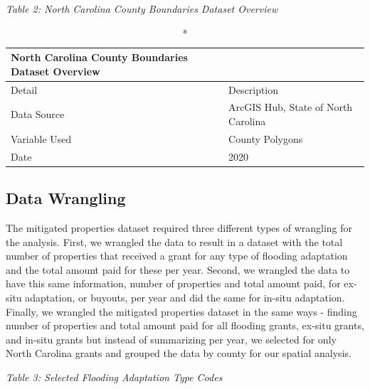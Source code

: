 \documentclass[
  12pt,
]{article}
\begin{document}
\emph{Table 2: North Carolina County Boundaries Dataset Overview}
\captionsetup[table]{labelformat=empty,skip=1pt}

\begin{longtable}{ll}
\caption*{
{\large North Carolina County Boundaries Dataset Overview}
} \\ 
\toprule
Detail & Description \\ 
\midrule
Data Source & ArcGIS Hub, State of North Carolina \\ 
Variable Used & County Polygons \\ 
Date & 2020 \\ 
\bottomrule
\end{longtable}

\hypertarget{data-wrangling}{%
\subsection{Data Wrangling}\label{data-wrangling}}

The mitigated properties dataset required three different types of
wrangling for the analysis. First, we wrangled the data to result in a
dataset with the total number of properties that received a grant for
any type of flooding adaptation and the total amount paid for these per
year. Second, we wrangled the data to have this same information, number
of properties and total amount paid, for ex-situ adaptation, or buyouts,
per year and did the same for in-situ adaptation. Finally, we wrangled
the mitigated properties dataset in the same ways - finding number of
properties and total amount paid for all flooding grants, ex-situ
grants, and in-situ grants but instead of summarizing per year, we
selected for only North Carolina grants and grouped the data by county
for our spatial analysis.

\newpage

\emph{Table 3: Selected Flooding Adaptation Type Codes}
\end{document}
